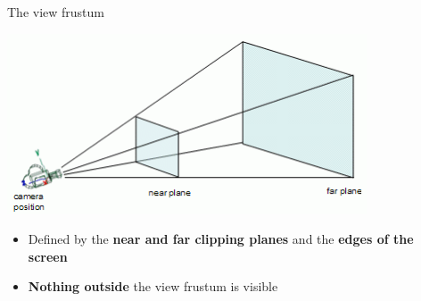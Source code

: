 \begin{frame}{The view frustum}
	\pause\begin{center}
		\includegraphics[width=0.8\textwidth]{frustum}
	\end{center}
	\begin{itemize}
		\pause\item Defined by the \textbf{near and far clipping planes} and the \textbf{edges of the screen}
		\pause\item \textbf{Nothing outside} the view frustum is visible
	\end{itemize}
\end{frame}
